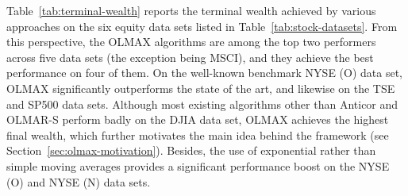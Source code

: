 Table~\ref{tab:terminal-wealth} reports the terminal wealth achieved by various approaches on the six equity data sets listed in Table~\ref{tab:stock-datasets}. From this perspective, the OLMAX algorithms are among the top two performers across five data sets (the exception being MSCI), and they achieve the best performance on four of them. On the well-known benchmark NYSE (O) data set, OLMAX significantly outperforms the state of the art, and likewise on the TSE and SP500 data sets. Although most existing algorithms other than Anticor and OLMAR-S perform badly on the DJIA data set, OLMAX achieves the highest final wealth, which further motivates the main idea behind the framework (see Section~\ref{sec:olmax-motivation}). Besides, the use of exponential rather than simple moving averages provides a significant performance boost on the NYSE (O) and NYSE (N) data sets.
